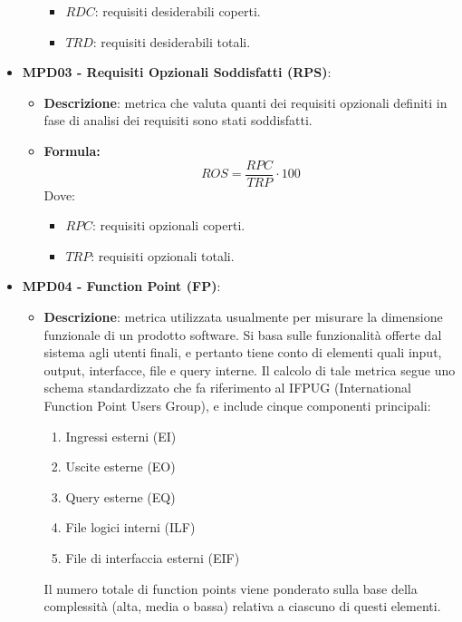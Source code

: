 \documentclass[10pt]{article}
\begin{document}
\begin{justify}
\begin{itemize}
\begin{itemize}
\begin{itemize}
                            \item $RDC$: requisiti desiderabili coperti.
                            \item $TRD$: requisiti desiderabili totali.
                        \end{itemize}
            \end{itemize}
    \item   \textbf{MPD03 - Requisiti Opzionali Soddisfatti (RPS)}:
            \begin{itemize}
                \item   \textbf{Descrizione}: metrica che valuta quanti dei requisiti opzionali definiti in fase di analisi dei requisiti sono stati soddisfatti.
                \item   \textbf{Formula:}
                        \[
                        ROS = \frac{RPC}{TRP} \cdot 100
                        \]
                        Dove:
                        \begin{itemize}
                            \item $RPC$: requisiti opzionali coperti.
                            \item $TRP$: requisiti opzionali totali.
                        \end{itemize}
            \end{itemize}
    \item   \textbf{MPD04 - Function Point (FP)}:
            \begin{itemize}
                \item   \textbf{Descrizione}: metrica utilizzata usualmente per misurare la dimensione funzionale di un prodotto software. Si basa sulle funzionalità 
                        offerte dal sistema agli utenti finali, e pertanto tiene conto di elementi quali input, output, interfacce, file e query interne.
                        Il calcolo di tale metrica segue uno schema standardizzato che fa riferimento al IFPUG (International Function Point Users Group), e include 
                        cinque componenti principali:
                        \begin{enumerate}
                            \item Ingressi esterni (EI)
                            \item Uscite esterne (EO)
                            \item Query esterne (EQ)
                            \item File logici interni (ILF)
                            \item File di interfaccia esterni (EIF)
                        \end{enumerate}
                        Il numero totale di function points viene ponderato sulla base della complessità (alta, media o bassa) relativa a ciascuno di questi elementi.


\end{itemize}
\end{itemize}
\end{justify}
\end{document}
